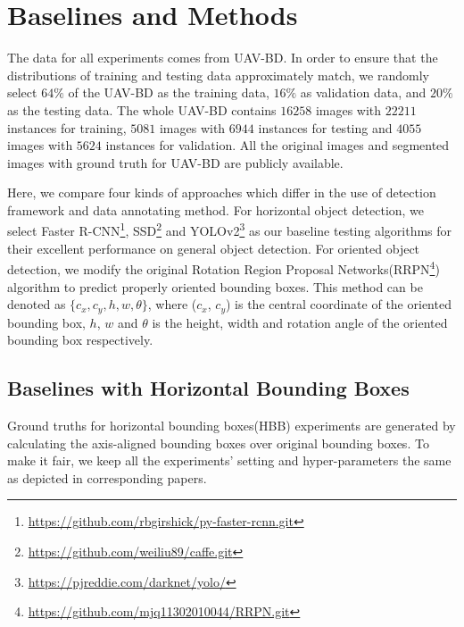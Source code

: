 \section{Baselines and Methods}
\label{sec:exp}


The data for all experiments comes from UAV-BD. In order to ensure that the distributions of training and testing data approximately match, we randomly select $ 64\% $ of the UAV-BD as the training data, $ 16\% $ as validation data, and $ 20\% $ as the testing data. The whole UAV-BD contains $ 16258 $ images with $ 22211 $ instances for training, $ 5081 $ images with $ 6944 $ instances for testing and $ 4055 $ images with $ 5624 $ instances for validation. All the original images and segmented images with ground truth for UAV-BD are publicly available.


Here, we compare four kinds of approaches which differ in the use of detection framework and data annotating method. For horizontal object detection, we select Faster R-CNN\footnote{\url{https://github.com/rbgirshick/py-faster-rcnn.git}}\cite{FasterRCNN},  SSD\footnote{\url{https://github.com/weiliu89/caffe.git}}\cite{SSD} and YOLOv2\footnote{\url{https://pjreddie.com/darknet/yolo/}}\cite{YOLOv2} as our baseline testing algorithms for their excellent performance on general object detection. For oriented object detection, we modify the original Rotation Region Proposal Networks(RRPN\footnote{\url{https://github.com/mjq11302010044/RRPN.git}}) algorithm\cite{RRPN} to predict properly oriented bounding boxes. This method can be denoted as $ \{c_x, c_y, h, w, \theta\} $, where ($ c_x $, $ c_y $) is the central coordinate of the oriented bounding box, $ h $, $ w $ and $ \theta $ is the height, width and rotation angle of the oriented bounding box respectively.


\subsection{Baselines with Horizontal Bounding Boxes}

Ground truths for horizontal bounding boxes(HBB) experiments are generated by calculating the axis-aligned bounding boxes over original bounding boxes. To make it fair, we keep all the experiments' setting and hyper-parameters the same as depicted in corresponding papers\cite{FasterRCNN, SSD, YOLOv2}.

